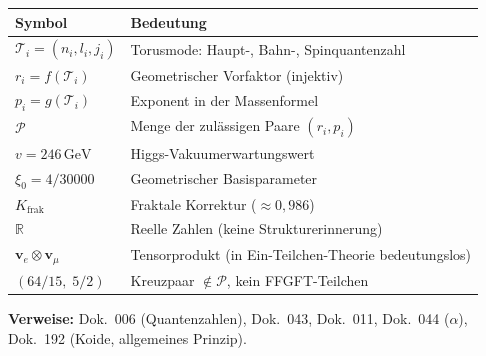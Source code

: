 \begin{center}
{\footnotesize
\begin{tabular}{lp{7cm}}
\toprule
\textbf{Symbol} & \textbf{Bedeutung} \\
\midrule
$\mathcal{T}_i = (n_i, l_i, j_i)$ & Torusmode: Haupt-, Bahn-, Spinquantenzahl \\
$r_i = f(\mathcal{T}_i)$ & Geometrischer Vorfaktor (injektiv) \\
$p_i = g(\mathcal{T}_i)$ & Exponent in der Massenformel \\
$\mathcal{P}$ & Menge der zulässigen Paare $(r_i, p_i)$ \\
$v = 246\,\text{GeV}$ & Higgs-Vakuumerwartungswert \\
$\xi_0 = 4/30000$ & Geometrischer Basisparameter \\
$K_{\text{frak}}$ & Fraktale Korrektur ($\approx 0{,}986$) \\
$\mathbb{R}$ & Reelle Zahlen (keine Strukturerinnerung) \\
$\mathbf{v}_e \otimes \mathbf{v}_\mu$ & Tensorprodukt (in Ein-Teilchen-Theorie bedeutungslos) \\
$(64/15,\;5/2)$ & Kreuzpaar $\notin \mathcal{P}$, kein FFGFT-Teilchen \\
\bottomrule
\end{tabular}
}
\end{center}


\medskip\noindent
\textbf{Verweise:} Dok.~006 (Quantenzahlen), Dok.~043, Dok.~011,
Dok.~044 ($\alpha$), Dok.~192 (Koide, allgemeines Prinzip).
